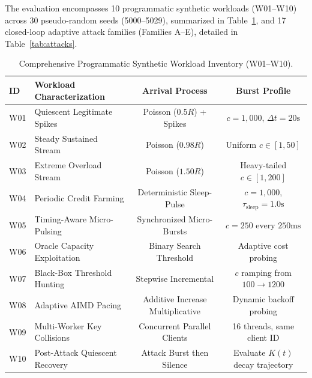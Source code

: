 \documentclass[conference]{IEEEtran}
\begin{document}
The evaluation encompasses 10 programmatic synthetic workloads (W01--W10) across 30 pseudo-random seeds (5000--5029), summarized in Table~\ref{tab:workloads}, and 17 closed-loop adaptive attack families (Families A--E), detailed in Table~\ref{tab:attacks}.

\begin{table}[t]
\centering
\caption{Comprehensive Programmatic Synthetic Workload Inventory (W01--W10).}
\label{tab:workloads}
\begin{tabular}{llcc}
\toprule
\textbf{ID} & \textbf{Workload Characterization} & \textbf{Arrival Process} & \textbf{Burst Profile} \\
\midrule
W01 & Quiescent Legitimate Spikes & Poisson ($0.5R$) + Spikes & $c = 1,000$, $\Delta t = 20\text{s}$ \\
W02 & Steady Sustained Stream & Poisson ($0.98R$) & Uniform $c \in [1, 50]$ \\
W03 & Extreme Overload Stream & Poisson ($1.50R$) & Heavy-tailed $c \in [1, 200]$ \\
W04 & Periodic Credit Farming & Deterministic Sleep-Pulse & $c = 1,000$, $\tau_{\text{sleep}} = 1.0\text{s}$ \\
W05 & Timing-Aware Micro-Pulsing & Synchronized Micro-Bursts & $c = 250$ every $250\text{ms}$ \\
W06 & Oracle Capacity Exploitation & Binary Search Threshold & Adaptive cost probing \\
W07 & Black-Box Threshold Hunting & Stepwise Incremental & $c$ ramping from $100 \to 1200$ \\
W08 & Adaptive AIMD Pacing & Additive Increase Multiplicative & Dynamic backoff probing \\
W09 & Multi-Worker Key Collisions & Concurrent Parallel Clients & 16 threads, same client ID \\
W10 & Post-Attack Quiescent Recovery & Attack Burst then Silence & Evaluate $K(t)$ decay trajectory \\
\bottomrule
\end{tabular}
\end{table}
\end{document}
